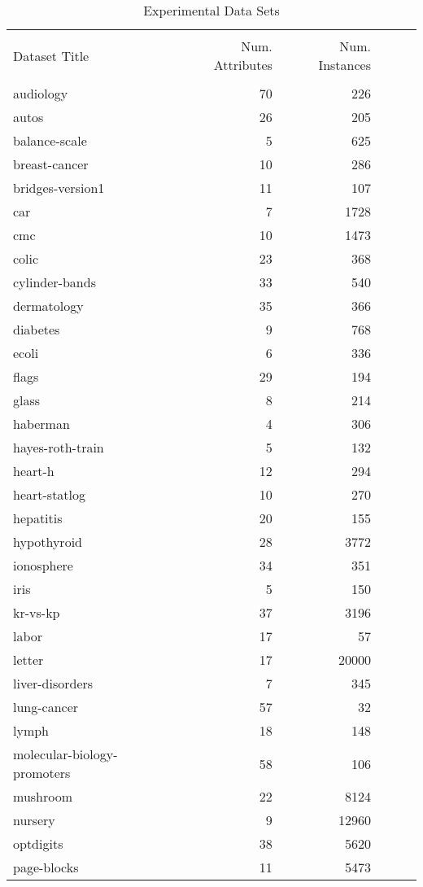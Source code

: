 \begin{table}[thb]
\caption{\label{dsets} Experimental Data Sets}
\footnotesize{\centering \begin{tabular}{lrr@{\hspace{0.1cm}}cr@{\hspace{0.1cm}}c}\\
\hline\\
Dataset Title & Num. Attributes & Num. Instances\\
\hline\\
audiology & 70 & 226\\
autos & 26 & 205\\
balance-scale & 5 & 625\\
breast-cancer & 10 & 286\\
bridges-version1 & 11 & 107\\
car & 7 & 1728\\
cmc & 10 & 1473\\
colic & 23 & 368\\
cylinder-bands & 33 & 540\\
dermatology & 35 & 366\\
diabetes & 9 & 768\\
ecoli & 6 & 336\\
flags & 29 & 194\\
glass & 8 & 214\\
haberman & 4 & 306\\
hayes-roth-train & 5 & 132\\
heart-h & 12 & 294\\
heart-statlog & 10 & 270\\
hepatitis & 20 & 155\\
hypothyroid & 28 & 3772\\
ionosphere & 34 & 351\\
iris & 5 & 150\\
kr-vs-kp & 37 & 3196\\
labor & 17 & 57\\
letter & 17 & 20000\\
liver-disorders & 7 & 345\\
lung-cancer & 57 & 32\\
lymph & 18 & 148\\
molecular-biology-promoters & 58 & 106\\
mushroom & 22 & 8124\\
nursery & 9 & 12960\\
optdigits & 38 & 5620\\
page-blocks & 11 & 5473\\

\end{tabular}}
\end{table}
